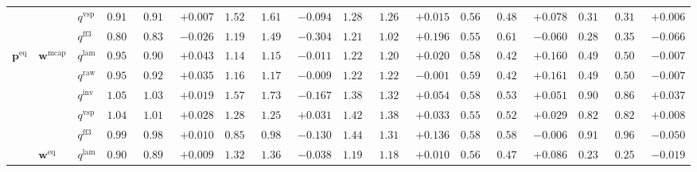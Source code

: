 \documentclass{article}
\begin{document}
\begin{table}[!htbp]
{\begin{tabular}{lll ccc ccc ccc ccc ccc}
 &  & $q^{\mathrm{vsp}}$ & $0.918$ & $0.911$ & \cellcolor{posgreen!50}$+0.007$ & $1.524$ & $1.618$ & \cellcolor{negred!50}$-0.094$ & $1.281$ & $1.266$ & \cellcolor{posgreen!50}$+0.015$ & $0.566$ & $0.488$ & \cellcolor{posgreen!50}$+0.078$ & $0.318$ & $0.312$ & \cellcolor{posgreen!50}$+0.006$ \\
 &  & $q^{\mathrm{ff3}}$ & $0.805$ & $0.831$ & \cellcolor{negred!50}$-0.026$ & $1.194$ & $1.498$ & \cellcolor{negred!50}$-0.304$ & $1.218$ & $1.022$ & \cellcolor{posgreen!50}$+0.196$ & $0.557$ & $0.617$ & \cellcolor{negred!50}$-0.060$ & $0.289$ & $0.356$ & \cellcolor{negred!50}$-0.066$ \\
\midrule
$\mathbf{p}^{\mathrm{eq}}$ & $\mathbf{w}^{\mathrm{mcap}}$ & $q^{\mathrm{lam}}$ & $0.950$ & $0.907$ & \cellcolor{posgreen!50}$+0.043$ & $1.147$ & $1.159$ & \cellcolor{negred!50}$-0.011$ & $1.226$ & $1.207$ & \cellcolor{posgreen!50}$+0.020$ & $0.584$ & $0.425$ & \cellcolor{posgreen!50}$+0.160$ & $0.499$ & $0.505$ & \cellcolor{negred!50}$-0.007$ \\
 &  & $q^{\mathrm{raw}}$ & $0.958$ & $0.923$ & \cellcolor{posgreen!50}$+0.035$ & $1.164$ & $1.173$ & \cellcolor{negred!50}$-0.009$ & $1.220$ & $1.221$ & \cellcolor{negred!50}$-0.001$ & $0.590$ & $0.429$ & \cellcolor{posgreen!50}$+0.161$ & $0.499$ & $0.505$ & \cellcolor{negred!50}$-0.007$ \\
 &  & $q^{\mathrm{inv}}$ & $1.057$ & $1.038$ & \cellcolor{posgreen!50}$+0.019$ & $1.571$ & $1.738$ & \cellcolor{negred!50}$-0.167$ & $1.380$ & $1.326$ & \cellcolor{posgreen!50}$+0.054$ & $0.585$ & $0.534$ & \cellcolor{posgreen!50}$+0.051$ & $0.903$ & $0.865$ & \cellcolor{posgreen!50}$+0.037$ \\
 &  & $q^{\mathrm{vsp}}$ & $1.040$ & $1.011$ & \cellcolor{posgreen!50}$+0.028$ & $1.287$ & $1.256$ & \cellcolor{posgreen!50}$+0.031$ & $1.422$ & $1.389$ & \cellcolor{posgreen!50}$+0.033$ & $0.551$ & $0.522$ & \cellcolor{posgreen!50}$+0.029$ & $0.828$ & $0.820$ & \cellcolor{posgreen!50}$+0.008$ \\
 &  & $q^{\mathrm{ff3}}$ & $0.998$ & $0.988$ & \cellcolor{posgreen!50}$+0.010$ & $0.857$ & $0.987$ & \cellcolor{negred!50}$-0.130$ & $1.448$ & $1.312$ & \cellcolor{posgreen!50}$+0.136$ & $0.582$ & $0.588$ & \cellcolor{negred!50}$-0.006$ & $0.910$ & $0.961$ & \cellcolor{negred!50}$-0.050$ \\
\cmidrule(lr){2-18}
 & $\mathbf{w}^{\mathrm{eq}}$ & $q^{\mathrm{lam}}$ & $0.908$ & $0.898$ & \cellcolor{posgreen!50}$+0.009$ & $1.329$ & $1.367$ & \cellcolor{negred!50}$-0.038$ & $1.199$ & $1.189$ & \cellcolor{posgreen!50}$+0.010$ & $0.564$ & $0.478$ & \cellcolor{posgreen!50}$+0.086$ & $0.237$ & $0.257$ & \cellcolor{negred!50}$-0.019$ \\

\end{tabular}}
\end{table}
\end{document}
